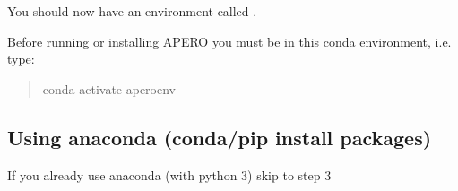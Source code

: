 \documentclass[a4paper,10pt,english]{report}
\begin{document}
You should now have an environment called .

Before running or installing APERO you must be in this conda environment, i.e. type:
\begin{quote}

\begin{sphinxVerbatim}[commandchars=\\\{\}]
conda activate apero\PYGZhy{}env
\end{sphinxVerbatim}
\end{quote}


\subsection{Using anaconda (conda/pip install packages)}
\label{\detokenize{misc/pythoninstallation:using-anaconda-conda-pip-install-packages}}\label{\detokenize{misc/pythoninstallation:python-install-anaconda-manual}}
If you already use anaconda (with python 3) skip to step 3
\end{document}
